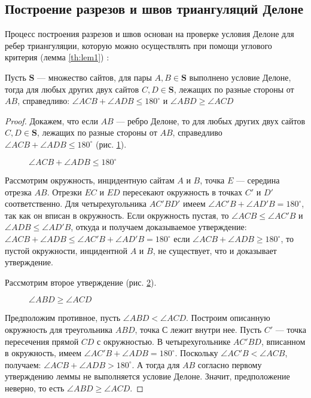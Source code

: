 \documentclass[12pt]{article}
\begin{document}
\subsection{Построение разрезов и швов триангуляций Делоне}
Процесс построения разрезов и швов основан на проверке условия Делоне для ребер триангуляции,
которую можно осуществлять при помощи углового критерия (лемма \ref{th:lem1}) :

\begin{lemma}
\label{th:lem1}
Пусть $\textbf{S}$ --- множество сайтов, для пары $A, B \in \textbf{S}$ выполнено условие Делоне, тогда
для любых других двух сайтов $C, D \in \textbf{S}$, лежащих по разные стороны от $AB$, справедливо:
$\angle ACB + \angle ADB \le 180^\circ$ и $\angle ABD \ge \angle ACD$
\end{lemma}

\begin{proof}
Докажем, что если $AB$ --- ребро Делоне, то для любых других двух сайтов $C, D \in \textbf{S}$, лежащих по разные стороны от $AB$, справедливо
$\angle ACB + \angle ADB \le 180^\circ$ (рис. \ref{pic:l11}).

\begin{figure}[htb!]
	\caption{$\angle ACB + \angle ADB \le 180^\circ$}
	\label{pic:l11}
\end{figure}

Рассмотрим окружность, инцидентную сайтам $A$ и $B$, точка $E$ --- середина отрезка $AB$.
Отрезки $EC$ и $ED$ пересекают окружность в точках $C'$ и $D'$ соответственно.
Для четырехугольника $AC'BD'$ имеем $\angle AC'B + \angle AD'B = 180^\circ$, так как он вписан в окружность.
Если окружность пустая, то $\angle ACB \le \angle AC'B$ и $\angle ADB \le \angle AD'B$, откуда и получаем доказываемое утверждение:
$\angle ACB + \angle ADB \le \angle AC'B + \angle AD'B = 180^\circ$
если $\angle ACB + \angle ADB \ge 180^\circ$, то пустой окружности, инцидентной $A$ и $B$, не существует, что и доказывает утверждение.

Рассмотрим второе утверждение (рис. \ref{pic:l12}).

\begin{figure}[htb!]
	\caption{$\angle ABD \ge \angle ACD$}
	\label{pic:l12}
\end{figure}

Предположим противное, пусть $\angle ABD < \angle ACD$.
Построим описанную окружность для треугольника $ABD$, точка $С$ лежит внутри нее.
Пусть $C'$ --- точка пересечения прямой $CD$ с окружностью. В четырехугольнике $AC'BD$, вписанном в окружность,
имеем $\angle AC'B + \angle ADB = 180^\circ$.
Поскольку $\angle AC'B < \angle ACB$, получаем: $\angle ACB + \angle ADB > 180^\circ$.
А тогда для $AB$ согласно первому утверждению леммы не выполняется условие Делоне.
Значит, предположение неверно, то есть $\angle ABD \ge \angle ACD$.
\end{proof}
\end{document}
